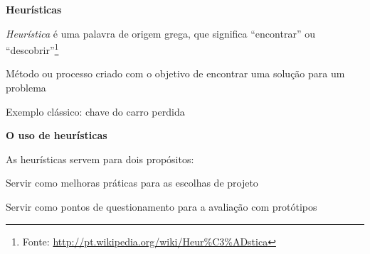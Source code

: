 \expandafter\documentclass\expandafter[table, usenames, svgnames, dvipsnames, \classopts]{beamer}
\begin{document}
\begin{frame}{\textbf{Heurísticas}}

	\begin{outline}

		\1 \textit{Heurística} é uma palavra de origem grega, que significa ``encontrar'' ou ``descobrir''\footnote{Fonte: \url{http://pt.wikipedia.org/wiki/Heur\%C3\%ADstica}}

		\vspace{1em}

		\1 Método ou processo criado com o objetivo de encontrar uma solução para um problema

		\vspace{1em}

		\1 Exemplo clássico: chave do carro perdida

	\end{outline}

\end{frame}

\begin{frame}{\textbf{O uso de heurísticas}}

	As heurísticas servem para dois propósitos:

	\begin{outline}

		\1 Servir como melhoras práticas para as escolhas de projeto

		\vspace{1em}

		\1 Servir como pontos de questionamento para a avaliação com protótipos

	\end{outline}

\end{frame}
\end{document}
